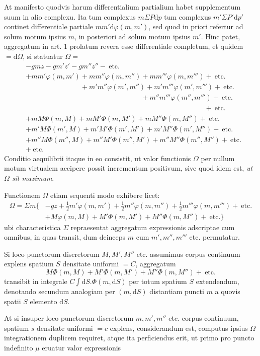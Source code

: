 At manifesto quodvis harum differentialium partialium habet supplementum suum in alio complexu. Ita tum complexus $m\Sigma P\mathrm{d}p$ tum complexus $m'\Sigma P'\mathrm{d}p'$ continet differentiale partiale $mm'\mathrm{d}\varphi(m,m')$, sed quod in priori refertur ad solum motum ipsius $m$, in posteriori ad solum motum ipsius $m'$. Hinc patet, aggregatum in art. 1 prolatum revera esse differentiale completum, et quidem $=\mathrm{d}\Omega$, si statuatur $\Omega=$
\[
\begin{aligned}
&-gmz-gm'z'-gm''z''-\ \text{etc.}\\
&+mm'\varphi(m,m')+mm''\varphi(m,m'')+mm'''\varphi(m,m''')+\ \text{etc.}\\
&\phantom{+mm'\varphi(m,m')}+m'm''\varphi(m',m'')+m'm'''\varphi(m',m''')+\ \text{etc.}\\
&\phantom{+mm'\varphi(m,m')+mm''\varphi(m,m'')}+m''m'''\varphi(m'',m''')+\ \text{etc.}\\
&\phantom{+mm'\varphi(m,m')+mm''\varphi(m,m'')+mm'''\varphi(m,m''')}+\ \text{etc.}\\
&+mM\Phi(m,M)+mM'\Phi(m,M')+mM''\Phi(m,M'')+\ \text{etc.}\\
&+m'M\Phi(m',M)+m'M'\Phi(m',M')+m'M''\Phi(m',M'')+\ \text{etc.}\\
&+m''M\Phi(m'',M)+m''M'\Phi(m'',M')+m''M''\Phi(m'',M'')+\ \text{etc.}\\
&+\ \text{etc.}
\end{aligned}
\]
Conditio aequilibrii itaque in eo consistit, ut valor functionis $\Omega$ per nullum motum virtualem accipere possit incrementum positivum, sive quod idem est, \textit{ut $\Omega$ sit maximum}.

Functionem $\Omega$ etiam sequenti modo exhibere licet:
\[
\begin{aligned}
\Omega=\Sigma m\{&-gz+\tfrac12m'\varphi(m,m')+\tfrac12m''\varphi(m,m'')+\tfrac12m'''\varphi(m,m''')+\ \text{etc.}\\
&+M\varphi(m,M)+M'\Phi(m,M')+M''\Phi(m,M'')+\ \text{etc.}\}
\end{aligned}
\]
ubi characteristica $\Sigma$ repraesentat aggregatum expressionis adscriptae cum omnibus, in quas transit, dum deinceps $m$ cum $m',m'',m'''$ etc. permutatur.

Si loco punctorum discretorum $M,M',M''$ etc. assumimus corpus continuum explens spatium $S$ densitate uniformi $=C$, aggregatum
\[
M\Phi(m,M)+M'\Phi(m,M')+M''\Phi(m,M'')+\ \text{etc.}
\]
transibit in integrale $C\int\mathrm{d}S.\Phi(m,\mathrm{d}S)$ per totum spatium $S$ extendendum, denotando secundum analogiam per $(m,\mathrm{d}S)$ distantiam puncti $m$ a quovis spatii $S$ elemento $\mathrm{d}S$.

At si insuper loco punctorum discretorum $m,m',m''$ etc. corpus continuum, spatium $s$ densitate uniformi $=c$ explens, considerandum est, computus ipsius $\Omega$ integrationem duplicem requiret, atque ita perficiendus erit, ut primo pro puncto indefinito $\mu$ eruatur valor expressionis
